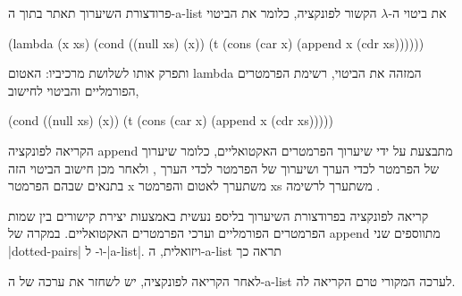 פרודצורת השיערוך תאתר בתוך ה-a-list את ביטוי ה-$λ$ הקשור לפונקציה, כלומר
את הביטוי
\begin{LISP}
(lambda
  (x xs)
  (cond ((null xs) (x))
        (t (cons
              (car x)
              (append x (cdr xs))))))
\end{LISP}
ותפרק אותו לשלושת
מרכיביו: האטום lambda המזהה את הביטוי, רשימת הפרמטרים הפורמליים 
והביטוי לחישוב,
\begin{LISP}
(cond ((null xs) (x))
      (t (cons
            (car x)
            (append x (cdr xs)))))
\end{LISP}
הקריאה לפונקציה append מתבצעת על ידי שיערוך הפרמטרים האקטואליים, כלומר שיערוך
של הפרמטר  לכדי הערך  ושיערוך של הפרמטר 
לכדי הערך , ולאחר מכן חישוב
הביטוי הזה בתנאים שבהם הפרמטר x משתערך לאטום
 והפרמטר xs משתערך לרשימה .

קריאה לפונקציה בפרודצורת השיערוך בליספ נעשית באמצעות יצירת קישורים בין שמות הפרמטרים הפורמליים
וערכי הפרמטרים האקטואליים. במקרה של append מתווספים שני \E|dotted-pairs|
 ו- ל-\E|a-list|.
ויזואלית, ה-a-list תראה כך
\begin{LTR}
\end{LTR}
לאחר הקריאה לפונקציה, יש לשחזר את ערכה של ה-a-list לערכה המקורי טרם הקריאה לה.

